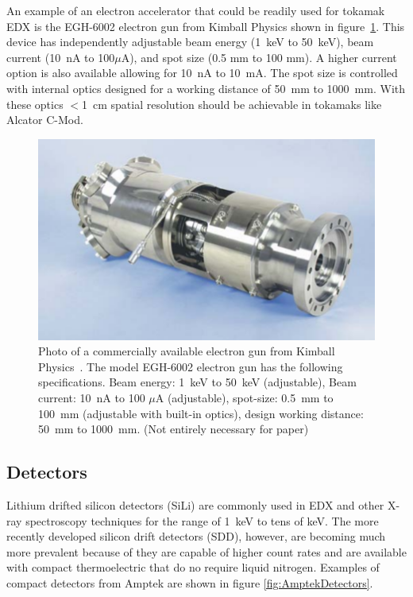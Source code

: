 \documentclass[12pt,letterpaper,final]{article}
\begin{document}
An example of an electron accelerator that could be readily used for tokamak EDX is the EGH-6002 electron gun from Kimball Physics \cite{KimballPhysics} shown in figure~\ref{fig:ElectronGun}. This device has independently adjustable beam energy (1~keV to 50~keV), beam current (10~nA to 100$\mu$A), and spot size (0.5 mm to 100 mm). A higher current option is also available allowing for 10~nA to 10~mA. The spot size is controlled with internal optics designed for a working distance of 50~mm to 1000~mm. With these optics $<$1~cm spatial resolution should be achievable in tokamaks like Alcator C-Mod.

\begin{figure}[!h]
 \centering
  \includegraphics[width=\columnwidth]{figures/ElectronGunEGH6002.png}
 \caption{Photo of a commercially available electron gun from Kimball Physics~\cite{KimballPhysics}. The model EGH-6002 electron gun has the following specifications. Beam energy: 1~keV to 50~keV (adjustable), Beam current: 10~nA to 100 $\mu$A (adjustable), spot-size: 0.5~mm to 100~mm (adjustable with built-in optics), design working distance: 50~mm to 1000~mm. (Not entirely necessary for paper)}
 \label{fig:ElectronGun}
\end{figure}

\subsection{Detectors}
\label{sec:detectors}
Lithium drifted silicon detectors (SiLi) are commonly used in EDX and other X-ray spectroscopy techniques for the range of 1~keV to tens of keV. The more recently developed silicon drift detectors (SDD), however, are becoming much more prevalent because of they are capable of higher count rates and are available with compact thermoelectric that do no require liquid nitrogen. Examples of compact detectors from Amptek \cite{Amptek} are shown in figure \ref{fig:AmptekDetectors}.
\end{document}
